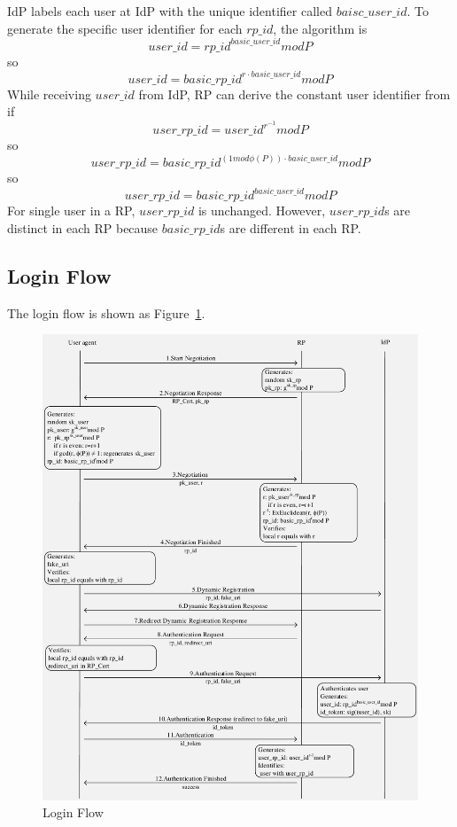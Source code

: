 IdP labels each user at IdP with the unique identifier called $baisc\_user\_id$. To generate the specific user identifier for each $rp\_id$, the algorithm is 
$$user\_id=rp\_id^{basic\_user\_id} mod P$$
so
$$user\_id=basic\_rp\_id^{r\cdot basic\_user\_id}modP$$
While receiving $user\_id$ from IdP, RP can derive the constant user identifier from if
$$user\_rp\_id=user\_id^{r^{-1}} mod P$$
so
$$user\_rp\_id=basic\_rp\_id^{(1 mod \phi(P))\cdot basic\_user\_id} mod P$$
so
$$user\_rp\_id=basic\_rp\_id^{basic\_user\_id} mod P$$
For single user in a RP, $user\_rp\_id$ is unchanged. However, $user\_rp\_id$s are distinct in each RP because $basic\_rp\_id$s are different in each RP.



\subsection{Login Flow}
The login flow is shown as Figure~\ref{fig:process}.
\begin{figure}
  \centering
  \includegraphics[width=\linewidth]{fig/process.pdf}
  \caption{Login Flow}
  \label{fig:process}
\end{figure}

